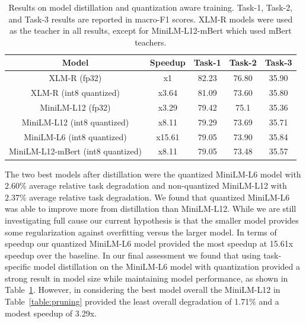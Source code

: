 \begin{table}[h]
\centering
\begin{tabular}{ccccc}
    \hline
    \textbf{Model} & \textbf{Speedup} &  \textbf{Task-1} & \textbf{Task-2} & \textbf{Task-3} \\
    \hline
    XLM-R \hspace{1cm} (fp32) & x1 & 82.23 & 76.80 & 35.90 \\
    XLM-R \hspace{1cm} (int8 quantized) & x3.64 & 81.09 & 73.60 & 35.80 \\
    \hline
    MiniLM-L12 \hspace{1cm} (fp32) & x3.29 & 79.42 & 75.1 & 35.36 \\		%
    MiniLM-L12 \hspace{1cm} (int8 quantized) & x8.11 & 79.29 & 73.69 & 35.71 \\  %
    \hline
    MiniLM-L6 \hspace{1cm} (int8 quantized) & x15.61 & 79.05 & 73.90 & 35.84 \\  %
    \hline
    \hline
    MiniLM-L12-mBert \hspace{1cm} (int8 quantized) & x8.11 & 79.05 & 73.48 & 35.57 \\
    \hline

\end{tabular}
\caption{
Results on model distillation and quantization aware training. 
Task-1, Task-2, and Task-3 results are reported in macro-F1 scores.  
XLM-R models were used as the teacher in all results, except for MiniLM-L12-mBert which used mBert teachers.
}
\label{table:distill}
\end{table}

The two best models after distillation were the quantized MiniLM-L6 model with $2.60$\% average relative task degradation and non-quantized MiniLM-L12 with $2.37$\% average relative task degradation.
We found that quantized MiniLM-L6 was able to improve more from distillation than MiniLM-L12.
While we are still investigating full cause our current hypothesis is that the smaller model provides some regularization against overfitting versus the larger model.
In terms of speedup our quantized MiniLM-L6 model provided the most speedup at 15.61x speedup over the baseline.
In our final assessment we found that using task-specific model distillation on the MiniLM-L6 model with quantization provided a strong result in model size while maintaining model performance, as shown in Table~\ref{table:distill}.
However, in considering the best model overall the MiniLM-L12 in Table~\ref{table:pruning} provided the least overall degradation of 1.71\% and a modest speedup of 3.29x.

